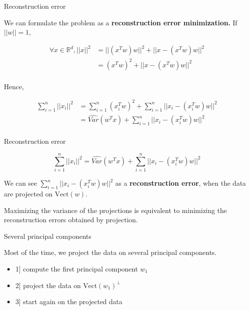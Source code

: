 \documentclass[usenames,dvipsnames]{beamer}
\begin{document}
\begin{frame}{Reconstruction error}

We can formulate the problem as a \textbf{{reconstruction error minimization.}} If $||w||=1$, 

    \begin{equation}
	\begin{aligned}
	    \label{eq:}
	    \forall x\in \mathbb{R}^d, ||x||^2 &= ||(x^Tw)w||^2+||x-(x^Tw)w||^2\\
	    &= (x^Tw)^2+||x-(x^Tw)w||^2\\
	\end{aligned}
    \end{equation}

    Hence,

    \begin{equation}
        \begin{aligned}
            \label{eq:}
	    \sum^{n}_{i=1} ||x_i||^2 &= \sum^{n}_{i=1} (x_i^Tw)^2+\sum^{n}_{i=1}||x_i-(x_i^Tw)w||^2\\
	    &= \hat{Var}(w^Tx) + \sum^{n}_{i=1}||x_i-(x_i^Tw)w||^2\\
        \end{aligned}
    \end{equation}
\end{frame}
    
\begin{frame}{Reconstruction error}

    \begin{equation}
	\sum^{n}_{i=1} ||x_i||^2 = \hat{Var}(w^Tx) + \sum^{n}_{i=1}||x_i-(x_i^Tw)w||^2
    \end{equation}

    We can see $\sum^{n}_{i=1}||x_i-(x_i^Tw)w||^2$ as a \textbf{{reconstruction error}}, when the data are projected on $\text{Vect}(w)$. 

    Maximizing the variance of the projections is equivalent to minimizing the reconstruction errors obtained by projection.
\end{frame}

\begin{frame}{Several principal components}

    Most of the time, we project the data on several principal components.

    \begin{itemize}
	\item 1] compute the first principal component $w_1$
	\item 2] project the data on $\text{Vect}(w_1)^{\perp}$
	\item 3] start again on the projected data
    \end{itemize}
\end{frame}
\end{document}
